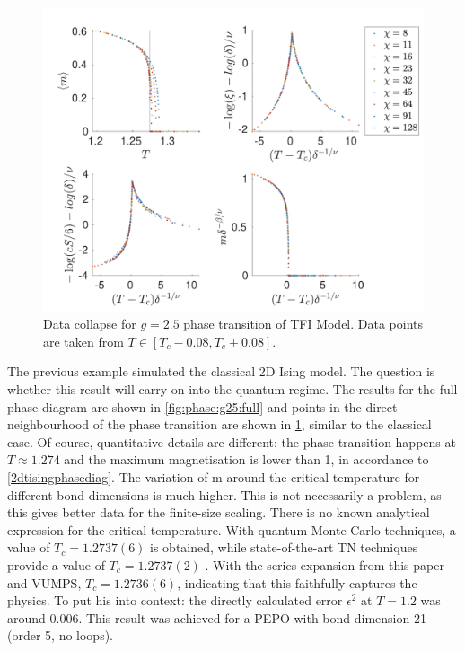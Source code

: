 \begin{figure}[!htbp]
    \center
    \includegraphics[width=\textwidth]{Figuren/phasediag/g25/zoomed.pdf}
    \caption{ Data collapse for $g=2.5$ phase transition of \Gls{TFI} Model. Data points are taken from $T \in \left[ T_c -0.08, T_c +0.08 \right]$. }
    \label{fig:phase:g25:zoomed}
\end{figure}

The previous example simulated the classical 2D Ising model. The question is whether this result will carry on into the quantum regime. The results for the full phase diagram are shown in \cref{fig:phase:g25:full} and points in the direct neighbourhood of the phase transition are shown in \cref{fig:phase:g25:zoomed}, similar to the classical case. Of course, quantitative details are different: the phase transition happens at $T\approx 1.274$ and the maximum magnetisation is lower than 1, in accordance to \cref{2dtisingphasediag}. The variation of m around the critical temperature for different bond dimensions is much higher. This is not necessarily a problem, as this gives better data for the finite-size scaling.
There is no known analytical expression for the critical temperature. With quantum Monte Carlo techniques, a value of $T_c=1.2737(6)$ is obtained, while state-of-the-art \Gls{TN} techniques provide a value of $T_c=1.2737(2)$ \cite{Czarnik2019}. With the series expansion from this paper and \Gls{VUMPS}, $T_c=1.2736(6)$, indicating that this faithfully captures the physics. To put his into context: the directly calculated error $\epsilon^{2}$  at $T=1.2$ was around $0.006$. This result was achieved for a PEPO with bond dimension 21 (order 5, no loops).

